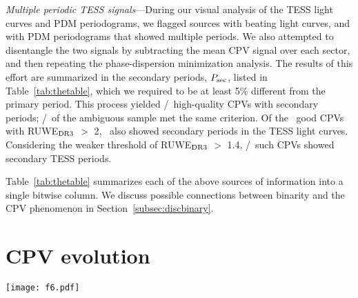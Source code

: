 \documentclass[11pt,twocolumn,tighten]{aastex63}
\begin{document}
{\it Multiple periodic TESS signals}---During our visual analysis of
the TESS light curves and PDM periodograms, we flagged sources with
beating light curves, and with PDM periodograms that showed multiple
periods.  We also attempted to disentangle the two signals by
subtracting the mean CPV signal over each sector, and then repeating
the phase-dispersion minimization analysis.  The results of this effort
are summarized in the secondary periods, $P_{\rm sec}$, listed in
Table~\ref{tab:thetable}, which we required to be at least 5\%
different from the primary period.  This process yielded
\ngoodmultperiodflag/\ngoods\ high-quality CPVs with secondary
periods; \nmaybemultperiodflag/\nmaybes\ of the ambiguous sample met
the same criterion.  Of the \ngoodhighruwe\ good CPVs with RUWE$_{\rm
DR3}$ $>$ 2, \ngoodruweandmultperiod\ also showed secondary periods in
the TESS light curves.  Considering the weaker threshold of RUWE$_{\rm
DR3}$ $>$ 1.4, \ngoodweakruweandmultperiod/\ngoodweakruwe\ such CPVs
showed secondary TESS periods.

Table~\ref{tab:thetable} summarizes each of the above sources of
information into a single bitwise column.  We discuss possible
connections between binarity and the CPV phenomenon in
Section~\ref{subsec:discbinary}.


\section{CPV evolution}
\label{sec:evoln}

\begin{figure*}[!tp]
	\begin{center}
		\centering
		\texttt{[image: f6.pdf]}
		\vspace{-0.6cm}
		\caption{
			{\bf Evolution of CPV light curves over two years.}
			Out of the \ngoods\ CPVs in Figure~\ref{fig:cqvs}, 32 had
			120-second cadence TESS data available for a baseline of at
			least two years; the 27 brightest are shown here due to space
			constraints.  Each panel shows one sector of TESS data, and is
			phased to its deepest minimum in flux.  Each panel's title shows
			the TIC identifier and period in hours.  Text insets
			show the TESS sector numbers, which generally span two years, or
			at least 1{,}000 cycles.  The vertical scale is fixed across
			sectors to clarify shape changes.  Gray circles are raw 2-minute
			data; colored circles bin to 300 points per cycle. 
		}
		\label{fig:evoln}
	\end{center}
\end{figure*}
\end{document}
